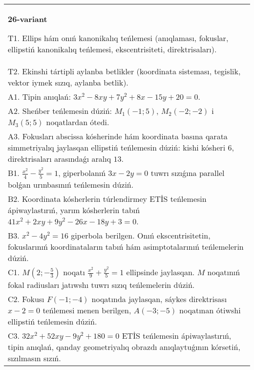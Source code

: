 \documentclass{article}
\begin{document}
\begin{tabular}{m{17cm}}
\textbf{26-variant}
\newline

T1. Ellips hám onıń kanonikalıq teńlemesi (anıqlaması, fokuslar, ellipstiń kanonikalıq teńlemesi, ekscentrisiteti, direktrisaları).\\

T2. Ekinshi tártipli aylanba betlikler (koordinata sisteması, tegislik, vektor iymek sızıq, aylanba betlik).\\

A1. Tipin anıqlań: $3 x^{2}-8 xy+7 y^{2}+8 x-15 y+20=0$.\\

A2. Sheńber teńlemesin dúziń: $M_1 (-1;5) $, $M_2 (-2;-2) $ i $M_3 (5;5) $ noqatlardan ótedi.\\

A3. Fokusları abscissa kósherinde hám koordinata basına qarata simmetriyalıq jaylasqan ellipstiń teńlemesin dúziń: kishi kósheri $6$, direktrisaları arasındaǵı aralıq $13$.\\

B1. $\frac{x^{2}}{4} - \frac{y^{2}}{5} = 1$, giperbolanıń $3x - 2y = 0$ tuwrı sızıǵına parallel bolǵan urınbasınıń teńlemesin dúziń.  \\

B2. Koordinata kósherlerin túrlendirmey ETİS teńlemesin ápiwaylastırıń, yarım kósherlerin tabıń $41x^{2} + 2xy + 9y^{2} - 26x - 18y + 3 = 0$.  \\

B3. $x^{2} - 4y^{2} = 16$ giperbola berilgen. Onıń ekscentrisitetin, fokuslarınıń koordinataların tabıń hám asimptotalarınıń teńlemelerin dúziń.\\

C1. $M(2; - \frac{5}{3})$ noqatı $\frac{x^{2}}{9} + \frac{y^{2}}{5} = 1$ ellipsinde jaylasqan. $M$ noqatınıń fokal radiusları jatıwshı tuwrı sızıq teńlemelerin dúziń.  \\

C2. Fokusı $F( - 1; - 4)$ noqatında jaylasqan, sáykes direktrisası $x - 2 = 0$ teńlemesi menen berilgen, $A( - 3; - 5)$ noqatınan ótiwshi ellipstiń teńlemesin dúziń.  \\

C3. $32x^{2} + 52xy - 9y^{2} + 180 = 0$ ETİS teńlemesin ápiwaylastırıń, tipin anıqlań, qanday geometriyalıq obrazdı anıqlaytuǵının kórsetiń, sızılmasın sızıń.  \\

\end{tabular}
\vspace{1cm}
\end{document}
